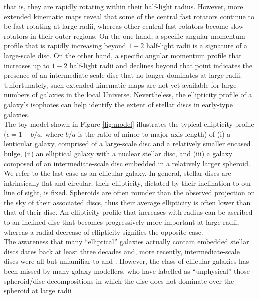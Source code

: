 \documentclass[useAMS,usenatbib,article]{mn2e}
\begin{document}
that is, they are rapidly rotating within their half-light radius.  
However, more extended kinematic maps \citep{arnold2014} reveal that 
some of the central fast rotators continue to be fast rotating at large radii, 
whereas other central fast rotators become slow rotators in their outer regions.
On the one hand, a specific angular momentum profile that is rapidly increasing beyond $1-2$ half-light radii 
is a signature of a large-scale disc. 
On the other hand, a specific angular momentum profile that increases up to $1-2$ half-light radii and declines beyond that point 
indicates the presence of an intermediate-scale disc that no longer dominates at large radii. 
Unfortunately, such extended kinematic maps are not yet available for large numbers of galaxies in the local Universe. 
Nevertheless, the ellipticity profile of a galaxy's isophotes can help identify the extent of stellar discs in early-type galaxies. \\
The toy model shown in Figure \ref{fig:model} illustrates the typical ellipticity profile 
($\epsilon = 1 - b/a$, where $b/a$ is the ratio of minor-to-major axis length) of 
(i) a lenticular galaxy, comprised of a large-scale disc and a relatively smaller encased bulge, 
(ii) an elliptical galaxy with a nuclear stellar disc, 
and (iii) a galaxy composed of an intermediate-scale disc embedded in a relatively larger spheroid. 
We refer to the last case as an ellicular galaxy. 
In general, stellar discs are intrinsically flat and circular; 
their ellipticity, dictated by their inclination to our line of sight, is fixed. 
Spheroids are often rounder than the observed projection on the sky of their associated discs, 
thus their average ellipticity is often lower than that of their disc. 
An ellipticity profile that increases with radius can be ascribed to an inclined disc that becomes progressively more important at large radii, 
whereas a radial decrease of ellipticity signifies the opposite case. \\
The awareness that many ``elliptical'' galaxies actually contain embedded stellar discs 
dates back at least three decades 
\citep{capaccioli1987,carter1987,rixwhite1990,bender1990,scorzabender1990,nieto1991,rixwhite1992,scorzabender1995,
donofrio1995,graham1998fornax,scorza1998,scorzavandenbosch1998} and, 
more recently, intermediate-scale discs were all but unfamiliar to \cite{kormendybender2012} and \cite{krajnovic2013etal}. 
However, the class of ellicular galaxies has been missed by many galaxy modellers, 
who have labelled as ``unphysical'' \citep{allen2006} those spheroid/disc decompositions in which the disc does not dominate over the spheroid at large radii 
\end{document}
